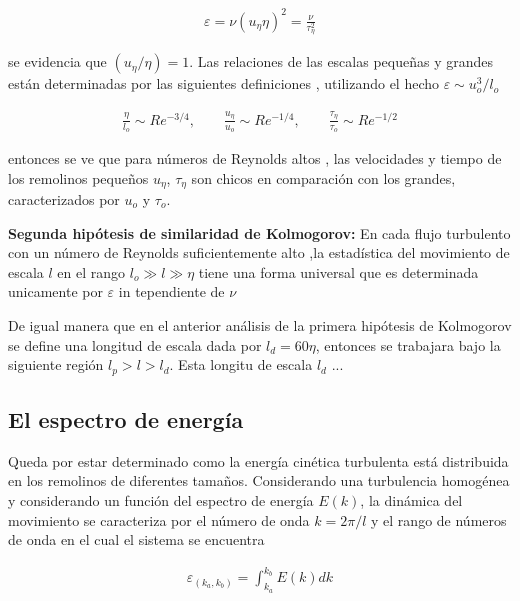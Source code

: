 \begin{eqnarray}
\varepsilon = \nu\left(u_{\eta}\eta\right)^{2}=\frac{\nu}{\tau_{\eta}^{2}}
\end{eqnarray}

\noindent se evidencia que $(u_{\eta}/\eta)=1$. Las relaciones de las escalas pequeñas y grandes están determinadas por las siguientes definiciones , utilizando el hecho $\varepsilon \sim u_{o}^{3}/l_{o}$

\begin{eqnarray}
\frac{\eta}{l_{o}}\sim Re^{-3/4},\qquad \frac{u_{\eta}}{u_{o}}\sim Re^{-1/4},\qquad
\frac{\tau_{\eta}}{\tau_{o}}\sim Re^{-1/2}
\end{eqnarray}

\noindent entonces se ve que para números de Reynolds altos , las velocidades y tiempo de los remolinos pequeños $u_{\eta}$, $\tau_{\eta}$ son chicos en comparación con los grandes, caracterizados por $u_{o}$ y $\tau_{o}$.

\medskip

\hangindent=0.7cm \textbf{Segunda hipótesis de similaridad de Kolmogorov: }En cada flujo turbulento con un número de Reynolds suficientemente alto ,la estadística del movimiento de escala $l$ en el rango  $l_{o}\gg l \gg\eta$ tiene una forma universal que es determinada unicamente por $\varepsilon$ in tependiente de $\nu$

\medskip

\noindent De igual manera que en el anterior análisis de la primera hipótesis de Kolmogorov se define una longitud de escala dada por $l_{d} = 60\eta$, entonces se trabajara bajo la siguiente región $l_{p}>l>l_{d}$. Esta longitu de escala $l_{d}$ ...





\subsection{El espectro de energía}


\noindent Queda por estar determinado como la energía cinética turbulenta está distribuida en los remolinos de diferentes tamaños. Considerando una turbulencia homogénea y considerando un función del espectro de energía $E(k)$, la dinámica del movimiento se caracteriza por el número de onda  $k=2\pi/l$ y el rango de números de onda en el cual el sistema se encuentra 

\begin{eqnarray}
\varepsilon_{(k_{a},k_{b})} = \int_{k_{a}}^{k_{b}}E(k)dk
\end{eqnarray}

